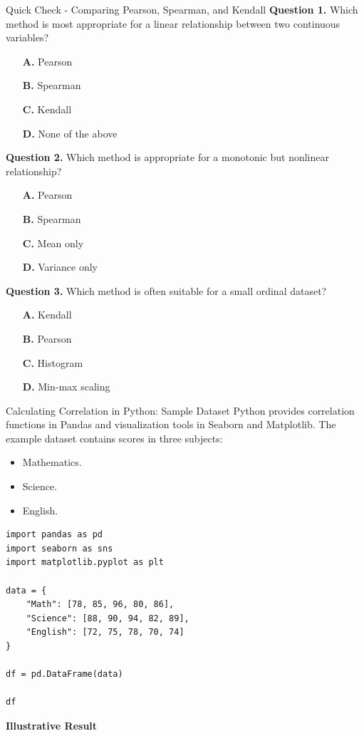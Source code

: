 \documentclass[aspectratio=169,11pt]{beamer}
\begin{document}
\begin{frame}[allowframebreaks]{Quick Check - Comparing Pearson, Spearman, and Kendall}
\footnotesize
\textbf{Question 1.} Which method is most appropriate for a linear relationship between two continuous variables?\par\medskip
\begin{itemize}
\item[\textbf{A.}] Pearson
\item[\textbf{B.}] Spearman
\item[\textbf{C.}] Kendall
\item[\textbf{D.}] None of the above
\end{itemize}
\textbf{Question 2.} Which method is appropriate for a monotonic but nonlinear relationship?\par\medskip
\begin{itemize}
\item[\textbf{A.}] Pearson
\item[\textbf{B.}] Spearman
\item[\textbf{C.}] Mean only
\item[\textbf{D.}] Variance only
\end{itemize}
\textbf{Question 3.} Which method is often suitable for a small ordinal dataset?\par\medskip
\begin{itemize}
\item[\textbf{A.}] Kendall
\item[\textbf{B.}] Pearson
\item[\textbf{C.}] Histogram
\item[\textbf{D.}] Min-max scaling
\end{itemize}
\end{frame}
\begin{frame}{Calculating Correlation in Python: Sample Dataset}
\small
Python provides correlation functions in Pandas and visualization tools in Seaborn and Matplotlib. The example dataset contains scores in three subjects:\par\medskip
\begin{itemize}
\item Mathematics.
\item Science.
\item English.
\end{itemize}
\begin{lstlisting}[style=py]
import pandas as pd
import seaborn as sns
import matplotlib.pyplot as plt

data = {
    "Math": [78, 85, 96, 80, 86],
    "Science": [88, 90, 94, 82, 89],
    "English": [72, 75, 78, 70, 74]
}

df = pd.DataFrame(data)

df
\end{lstlisting}
\textbf{Illustrative Result}\par\medskip
\end{frame}
\end{document}
